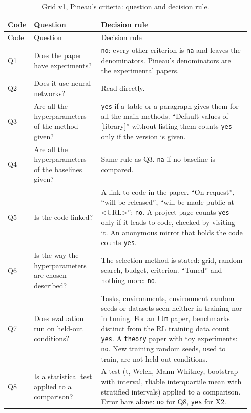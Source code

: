 \begin{small}
\begin{longtable}{@{}p{0.07\linewidth}>{\raggedright\arraybackslash}p{0.27\linewidth}>{\raggedright\arraybackslash}p{0.6\linewidth}@{}}
\caption{Grid v1, Pineau's criteria: question and decision rule.}\label{tab:a-grille-q}\\
\toprule
Code & Question & Decision rule \\
\midrule
\endfirsthead
\toprule
Code & Question & Decision rule \\
\midrule
\endhead
\bottomrule
\endfoot
Q1 & Does the paper have experiments? & \texttt{no}: every other criterion is \texttt{na} and
  leaves the denominators. Pineau's denominators are the experimental papers. \\
Q2 & Does it use neural networks? & Read directly. \\
Q3 & Are all the hyperparameters of the method given? & \texttt{yes} if a table or a paragraph gives
  them for all the main methods. \enquote{Default values of [library]} without listing them counts
  \texttt{yes} only if the version is given. \\
Q4 & Are all the hyperparameters of the baselines given? & Same rule as Q3. \texttt{na} if no
  baseline is compared. \\
Q5 & Is the code linked? & A link to code in the paper. \enquote{On request}, \enquote{will be
  released}, \enquote{will be made public at <URL>}: \texttt{no}. A project page counts \texttt{yes}
  only if it leads to code, checked by visiting it. An anonymous mirror that holds
  the code counts \texttt{yes}. \\
Q6 & Is the way the hyperparameters are chosen described? & The selection method is stated: grid,
  random search, budget, criterion. \enquote{Tuned} and nothing more: \texttt{no}. \\
Q7 & Does evaluation run on held-out conditions? & Tasks, environments, environment random seeds or
  datasets seen neither in training nor in tuning. For an \texttt{llm} paper, benchmarks distinct
  from the RL training data count \texttt{yes}. A \texttt{theory} paper with toy experiments:
  \texttt{no}. New training random seeds, used to train, are not held-out conditions. \\
Q8 & Is a statistical test applied to a comparison? & A test (t, Welch, Mann-Whitney, bootstrap with
  interval, rliable interquartile mean with stratified intervals) applied to a comparison. Error bars
  alone: \texttt{no} for Q8, \texttt{yes} for X2. \\
\end{longtable}
\end{small}

